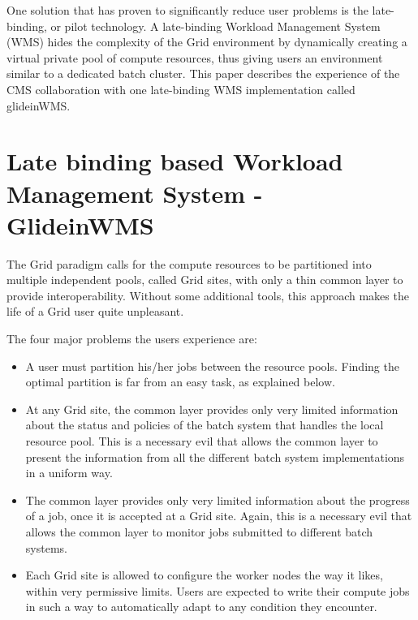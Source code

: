 \documentclass[a4paper]{jpconf}
\begin{document}
One solution that has proven to significantly reduce user problems is the late-binding, or pilot technology.  
A late-binding Workload Management System (WMS) hides the complexity of the Grid environment by dynamically creating 
a virtual private pool of compute resources, thus giving users an environment similar to a dedicated batch cluster.
This paper describes the experience of the CMS collaboration with one late-binding WMS implementation called glideinWMS. 


\section{Late binding based Workload Management System - GlideinWMS }

The Grid paradigm calls for the compute resources to be partitioned into multiple independent pools, called Grid sites,
with only a thin common layer to provide interoperability. 
Without some additional tools, this approach makes the life of a Grid user quite unpleasant. 

The four major problems the users experience are:
\begin {itemize}
\item 
A user must partition his/her jobs between the resource pools.
Finding the optimal partition is far from an easy task, as explained below.
\item
At any Grid site, the common layer provides only very limited information about the status and policies of the
batch system that handles the local resource pool.
This is a necessary evil that allows the common layer to present the information from all the different batch system 
implementations in a uniform way. 
\item 
The common layer provides only very limited information about the progress of a job, once it is accepted at a Grid site.
Again, this is a necessary evil that allows the common layer to monitor jobs submitted to different batch systems.  
\item
Each Grid site is allowed to configure the worker nodes the way it likes, within very permissive limits.
Users are expected to write their compute jobs in such a way to automatically adapt to any condition they encounter.
\end{itemize}
\end{document}
